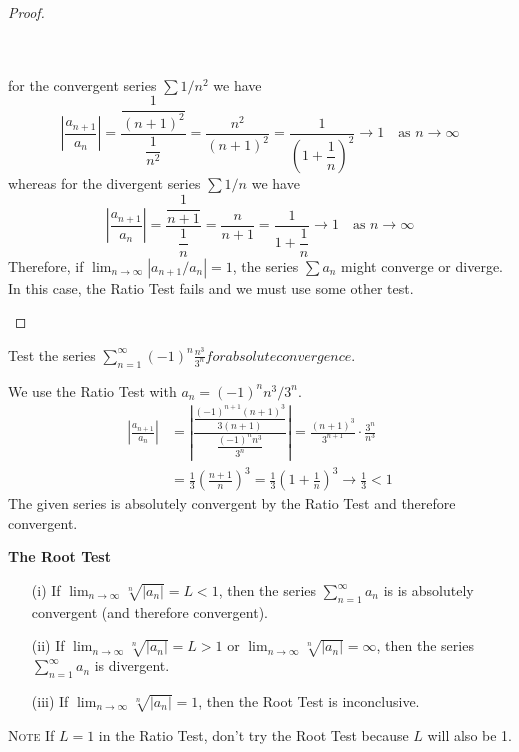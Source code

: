 \begin{proof}
\begin{enumerate}
         \\~\\
         for the convergent series $\sum 1/n^2$ we have
         $$ \left|\frac{a_{n+1}}{a_n}\right| = \frac{\dfrac{1}{(n+1)^2}}{\dfrac{1}{n^2}} = \frac{n^2}{(n+1)^2} = \frac{1}{\left(1+\dfrac{1}{n}\right)^2} \to 1 \quad\text{as } n\to\infty $$
         whereas for the divergent series $\sum 1/n$ we have
         $$ \left|\frac{a_{n+1}}{a_n}\right| = \frac{\dfrac{1}{n+1}}{\dfrac{1}{n}} = \frac{n}{n+1} = \frac{1}{1+\dfrac{1}{n}} \to 1 \quad\text{as } n\to\infty $$
         Therefore, if $\lim_{n\to\infty} |a_{n+1}/a_n| = 1$, the series $\sum a_n$ might converge or diverge. In this case, the Ratio Test fails and we must use some other test.
      \end{enumerate}
  \end{proof}
  \begin{example}
    Test the series $\displaystyle \sum_{n=1}^{\infty} (-1)^n \frac{n^3}{3^n} for absolute convergence.$
  \end{example}
  \begin{solution}
    We use the Ratio Test with $a_n = (-1)^n n^3/3^n$.
    \begin{align*}
      \left|\frac{a_{n+1}}{a_n}\right| &= \left|\frac{\dfrac{(-1)^{n+1}(n+1)^3}{3(n+1)}}{\dfrac{(-1)^n n^3}{3^n}}\right| = \frac{(n+1)^3}{3^{n+1}} \cdot \frac{3^n}{n^3} \\
      &= \frac{1}{3} \left(\frac{n+1}{n}\right)^3 = \frac{1}{3} \left(1 + \frac{1}{n}\right)^3 \to \frac{1}{3} < 1
    \end{align*}
    The given series is absolutely convergent by the Ratio Test and therefore convergent.
  \end{solution}
  \begin{definition}
    \textbf{The Root Test}\\
    \begin{enumerate}
      \item[(i)] If $\displaystyle\lim_{n\to\infty} \sqrt[n]{|a_n|} = L < 1$, then the series $\displaystyle\sum_{n=1}^{\infty} a_n$ is is absolutely convergent (and therefore convergent).
      \item[(ii)] If $\displaystyle\lim_{n\to\infty} \sqrt[n]{|a_n|} = L > 1$ or $\displaystyle\lim_{n\to\infty} \sqrt[n]{|a_n|} = \infty$, then the series $\displaystyle\sum_{n=1}^{\infty} a_n$ is divergent.
      \item[(iii)] If $\displaystyle\lim_{n\to\infty} \sqrt[n]{|a_n|} = 1$, then the Root Test is inconclusive.
    \end{enumerate}
    \textsc{Note} If $L=1$ in the Ratio Test, don't try the Root Test because $L$ will also be 1.
  \end{definition}
